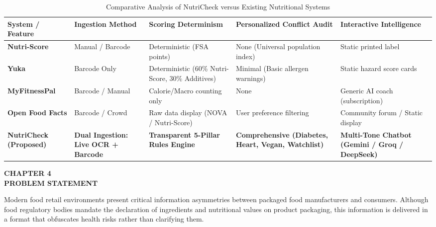 \documentclass[12pt]{article}
\begin{document}
\begin{table}[h!]
\centering
\caption{Comparative Analysis of NutriCheck versus Existing Nutritional Systems}
\vspace{0.3cm}
\footnotesize
\begin{tabular}{|p{3.2cm}|p{2cm}|p{2.3cm}|p{2.6cm}|p{3.2cm}|}
\hline
\textbf{System / Feature} & \textbf{Ingestion Method} & \textbf{Scoring Determinism} & \textbf{Personalized Conflict Audit} & \textbf{Interactive Intelligence} \\
\hline
\textbf{Nutri-Score} & Manual / Barcode & Deterministic (FSA points) & None (Universal population index) & Static printed label \\
\hline
\textbf{Yuka} & Barcode Only & Deterministic (60\% Nutri-Score, 30\% Additives) & Minimal (Basic allergen warnings) & Static hazard score cards \\
\hline
\textbf{MyFitnessPal} & Barcode / Manual & Calorie/Macro counting only & None & Generic AI coach (subscription) \\
\hline
\textbf{Open Food Facts} & Barcode / Crowd & Raw data display (NOVA / Nutri-Score) & User preference filtering & Community forum / Static display \\
\hline
\textbf{NutriCheck (Proposed)} & \textbf{Dual Ingestion: Live OCR + Barcode} & \textbf{Transparent 5-Pillar Rules Engine} & \textbf{Comprehensive (Diabetes, Heart, Vegan, Watchlist)} & \textbf{Multi-Tone Chatbot (Gemini / Groq / DeepSeek)} \\
\hline
\end{tabular}
\end{table}

\newpage

\begin{center}
\textbf{\Large CHAPTER 4}\\[0.5cm]
\textbf{\Large PROBLEM STATEMENT}\\[1cm]
\end{center}

\noindent
Modern food retail environments present critical information asymmetries between packaged food manufacturers and consumers. Although food regulatory bodies mandate the declaration of ingredients and nutritional values on product packaging, this information is delivered in a format that obfuscates health risks rather than clarifying them.

\vspace{0.3cm}
\end{document}
